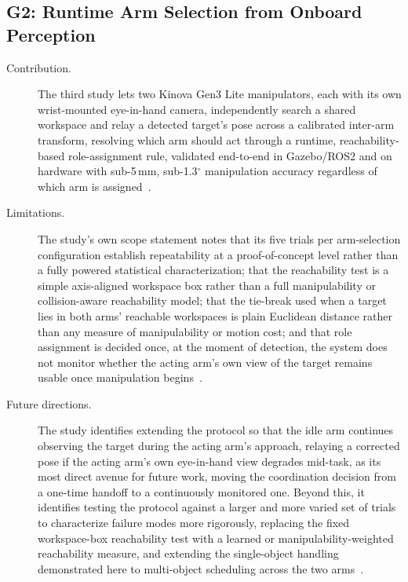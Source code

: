 \subsection{G2: Runtime Arm Selection from Onboard Perception}\label{sec:concl_g2}

\begin{description}
    \item[Contribution.] The third study lets two Kinova Gen3 Lite manipulators, each with its own
    wrist-mounted eye-in-hand camera, independently search a shared workspace and relay a detected
    target's pose across a calibrated inter-arm transform, resolving which arm should act through a
    runtime, reachability-based role-assignment rule, validated end-to-end in Gazebo/ROS2 and on
    hardware with sub-5\,mm, sub-1.3$^\circ$ manipulation accuracy regardless of which arm is
    assigned~\citep{sk2025sharedvision}.

    \item[Limitations.] The study's own scope statement notes that its five trials per arm-selection
    configuration establish repeatability at a proof-of-concept level rather than a fully powered
    statistical characterization; that the reachability test is a simple axis-aligned workspace box
    rather than a full manipulability or collision-aware reachability model; that the tie-break used
    when a target lies in both arms' reachable workspaces is plain Euclidean distance rather than any
    measure of manipulability or motion cost; and that role assignment is decided once, at the moment
    of detection, the system does not monitor whether the acting arm's own view of the target remains
    usable once manipulation begins~\citep{sk2025sharedvision}.

    \item[Future directions.] The study identifies extending the protocol so that the idle arm
    continues observing the target during the acting arm's approach, relaying a corrected pose if the
    acting arm's own eye-in-hand view degrades mid-task, as its most direct avenue for future work,
    moving the coordination decision from a one-time handoff to a continuously monitored one. Beyond
    this, it identifies testing the protocol against a larger and more varied set of trials to
    characterize failure modes more rigorously, replacing the fixed workspace-box reachability test
    with a learned or manipulability-weighted reachability measure, and extending the single-object
    handling demonstrated here to multi-object scheduling across the two
    arms~\citep{sk2025sharedvision}.
\end{description}

